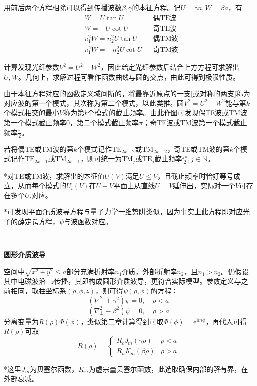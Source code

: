 \documentclass[a4paper,UTF8,fontset=windows]{ctexart}
\newcommand*{\er}{\mathrm{e}}
\newcommand*{\ir}{\mathrm{i}}
\begin{document}
用前后两个方程相除可以得到传播波数$\beta,\gamma$的本征方程。记$U=\gamma a,W=\beta a$，有
$$\begin{aligned}&W=U\tan U&&\text{偶TE波}\\ &W=-U\cot U&&\text{奇TE波}\\ &n_1^2W=n_2^2U\tan U&&\text{偶TM波}\\ &n_1^2W=-n_2^2U\cot U&&\text{奇TM波}\end{aligned}$$

计算发现光纤参数$V^2=U^2+W^2$，因此给定光纤参数后结合上方方程可求解出$U,W$。几何上，求解过程可看作函数曲线与圆的交点，由此可得到极限性质。

由于本征方程对应的函数定义域间断的，将最靠近原点的一支[或对称的两支]称为对应波的第一个模式，其次称为第二个模式，以此类推。圆$V^2=U^2+W^2$能与第$k$个模式相交的最小$V$称为第$k$个模式的截止频率。由此作图可发现偶TE波或TM波第一个模式截止频率0，第二个模式截止频率$\pi$；奇TE波或TM波第一个模式截止频率$\frac{\pi}{2}$。

若将偶TE或TM波的第$k$个模式记作$\text{TE}_{2k-2}$或$\text{TM}_{2k-2}$，奇TE或TM波的第$k$个模式记作$\text{TE}_{2k-1}$或$\text{TM}_{2k-1}$，则可统一为$\text{TM}_j$或$\text{TE}_j$截止频率$\frac{j\pi}{2},j\in\mathbb{N}$。

*对TE或TM波，求解出的本征值$U(V)$满足$U\le V$，且截止频率时恰好等号成立，从而每个模式的$U_i(V)$在$U-V$平面上从直线$U=V$延伸出，实际对一个$V$可存在多个$U_i$对应。

*可发现平面介质波导方程与量子力学一维势阱类似，因为事实上此方程即对应光子的薛定谔方程，$\psi$与波函数对应。

\

\textbf{圆形介质波导}

空间中$\sqrt{x^2+y^2}\le a$部分充满折射率$n_1$介质，外部折射率$n_2$，且$n_1>n_2$。仍假设其中电磁波沿$+z$传播，其即构成圆形介质波导，更符合实际模型。参数定义与之前相同，取柱坐标系$(\rho,\phi,z)$，则可得$\psi(\rho,\phi)$的方程：
$$(\nabla_\bot^2+\gamma^2)\psi=0,\quad\rho<a$$
$$(\nabla_\bot^2-\beta^2)\psi=0,\quad\rho>a$$
分离变量为$R(\rho)\Phi(\phi)$，类似第二章计算得到可取$\Phi(\phi)=\er^{\ir m\phi}$，再代入可得$R(\rho)$可取
$$R(\rho)=\begin{cases}R_eJ_m(\gamma\rho)&\rho<a\\R_hK_m(\beta\rho)&\rho>a\end{cases}$$

*这里$J_m$为贝塞尔函数，$K_m$为虚宗量贝塞尔函数，此选取确保内部的解有界，在外部衰减。
\end{document}
